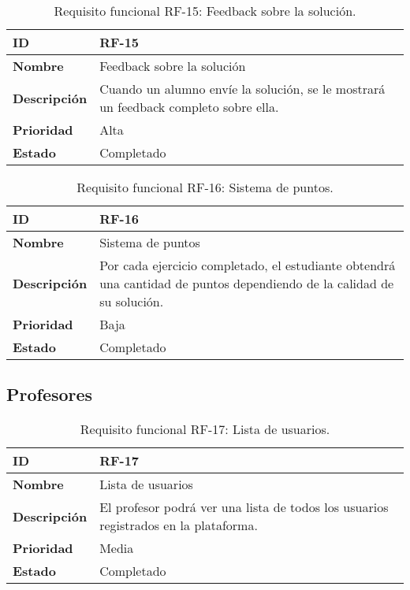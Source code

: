 \begin{table}[H]
    \centering
    \begin{tabular}{|l|p{9.5cm}|}
        \hline
        \textbf{ID} & RF-15 \\
        \hline
        \textbf{Nombre} & Feedback sobre la solución \\
        \hline
        \textbf{Descripción} & Cuando un alumno envíe la solución, se le mostrará un feedback completo sobre ella. \\
        \hline
        \textbf{Prioridad} & Alta \\
        \hline
        \textbf{Estado} & Completado \\
        \hline
    \end{tabular}
    \caption{Requisito funcional RF-15: Feedback sobre la solución.}
    \label{table:req-RF00D}
\end{table}

\begin{table}[H]
    \centering
    \begin{tabular}{|l|p{9.5cm}|}
        \hline
        \textbf{ID} & RF-16 \\
        \hline
        \textbf{Nombre} & Sistema de puntos \\
        \hline
        \textbf{Descripción} & Por cada ejercicio completado, el estudiante obtendrá una cantidad de puntos dependiendo de la calidad de su solución. \\
        \hline
        \textbf{Prioridad} & Baja \\
        \hline
        \textbf{Estado} & Completado \\
        \hline
    \end{tabular}
    \caption{Requisito funcional RF-16: Sistema de puntos.}
    \label{table:req-RF00E}
\end{table}

\subsection{Profesores}

\begin{table}[H]
    \centering
    \begin{tabular}{|l|p{9.5cm}|}
        \hline
        \textbf{ID} & RF-17 \\
        \hline
        \textbf{Nombre} & Lista de usuarios \\
        \hline
        \textbf{Descripción} & El profesor podrá ver una lista de todos los usuarios registrados en la plataforma. \\
        \hline
        \textbf{Prioridad} & Media \\
        \hline
        \textbf{Estado} & Completado \\
        \hline
    \end{tabular}
    \caption{Requisito funcional RF-17: Lista de usuarios.}
    \label{table:req-RF00F}
\end{table}

